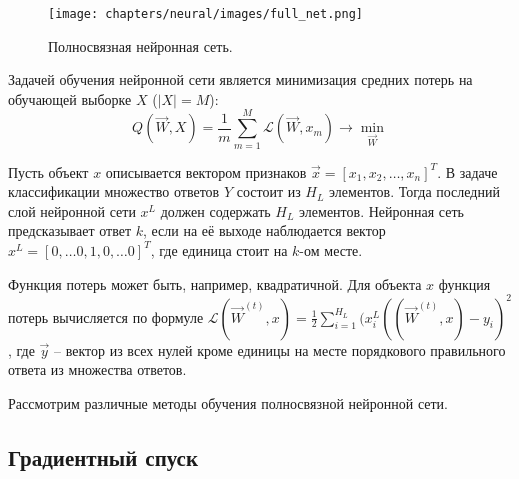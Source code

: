 \begin{figure}[h]
	\centering
	\texttt{[image: chapters/neural/images/full\_net.png]}
	\caption{Полносвязная нейронная сеть.}
	\label{img:full_net}
\end{figure}

Задачей обучения нейронной сети является минимизация средних потерь на обучающей выборке $X$ ($|X| = M$):
$$
Q(\overrightarrow{W}, X) = \frac{1}{m} \sum\limits_{m = 1}^{M} \mathcal{L} (\overrightarrow{W}, x_m) \rightarrow \min_{\overrightarrow{W}}
$$

Пусть объект $x$ описывается вектором признаков $\overrightarrow{x} = [x_1, x_2, \dots, x_n]^T$. В задаче классификации множество ответов $Y$ состоит из $H_L$ элементов. Тогда последний слой нейронной сети $x^{L}$ должен содержать $H_L$ элементов. Нейронная сеть предсказывает ответ $k$, если на её выходе наблюдается вектор $x^L = [0, \dots 0, 1, 0, \dots 0]^T$, где единица стоит на $k$-ом месте. 

Функция потерь может быть, например, квадратичной. Для объекта $x$ функция потерь вычисляется по формуле $\mathcal{L} (\overrightarrow{W}^{(t)}, x) = \frac{1}{2} \sum\limits_{i = 1}^{H_L} (x^L_i ((\overrightarrow{W}^{(t)}, x) - y_i)^2$, где $\overrightarrow{y}$ -- вектор из всех нулей кроме единицы на месте порядкового правильного ответа из множества ответов.

Рассмотрим различные методы обучения полносвязной нейронной сети.

\subsection{Градиентный спуск}

